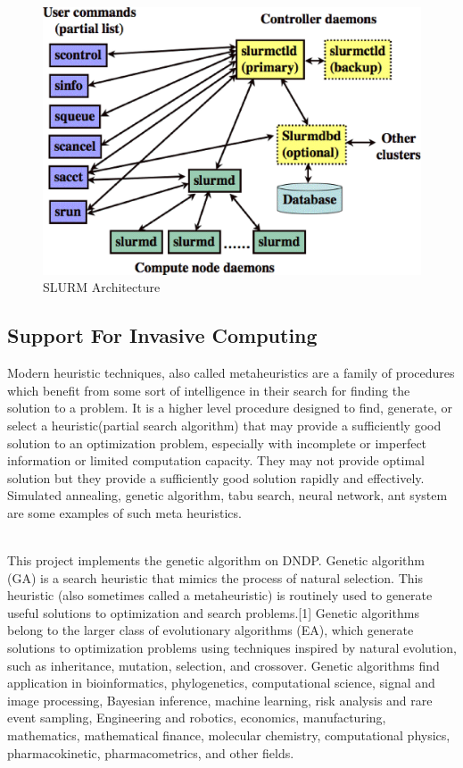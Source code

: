 \documentclass[a4paper, 12pt]{article}
\begin{document}
\begin{figure}[H]
\centering
\includegraphics[width=1.0\textwidth]{./arch.eps}
\vspace{-0.15in}
\caption{SLURM Architecture}
\label{fig:9}
\end{figure}
\subsection{Support For Invasive Computing}
Modern heuristic techniques, also called metaheuristics are a family of procedures which benefit from some sort of intelligence in their search for finding the solution to a problem. It is a higher level procedure designed to find, generate, or select a heuristic(partial search algorithm) that may provide a sufficiently good solution to an optimization problem, especially with incomplete or imperfect information or limited computation capacity. They may not provide optimal solution but they provide a sufficiently good solution rapidly and effectively. Simulated annealing, genetic algorithm, tabu search, neural network, ant system are some examples of such meta heuristics.\par
\noindent
\\This project implements the genetic algorithm on DNDP. Genetic algorithm (GA) is a search heuristic that mimics the process of natural selection. This heuristic (also sometimes called a metaheuristic) is routinely used to generate useful solutions to optimization and search problems.[1] Genetic algorithms belong to the larger class of evolutionary algorithms (EA), which generate solutions to optimization problems using techniques inspired by natural evolution, such as inheritance, mutation, selection, and crossover. Genetic algorithms find application in bioinformatics, phylogenetics, computational science, signal and image processing, Bayesian inference, machine learning, risk analysis and rare event sampling, Engineering and robotics, economics, manufacturing, mathematics, mathematical finance, molecular chemistry, computational physics, pharmacokinetic, pharmacometrics, and other fields.\par
\newpage
\end{document}
